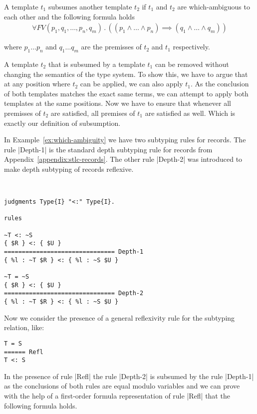 \begin{definition}
  A template $t_1$ subsumes another template $t_2$ if $t_1$ and $t_2$
  are which-ambiguous to each other and the following formula holds
  \begin{align}
    \forall FV(p_1,q_1,\dots, p_n,q_m) \,.\, ((p_1 \land\dots\land
    p_n) \implies (q_1 \land\dots\land q_m))
  \end{align}

  where $p_1 \dots p_n$ and $q_1 \dots q_m$ are the premisses of $t_2$
  and $t_1$ respectively.
\label{def:subsumes}
\end{definition}

A template $t_2$ that is subsumed by a template $t_1$ can be removed
without changing the semantics of the type system. To show this, we
have to argue that at any position where $t_2$ can be applied, we can
also apply $t_1$. As the conclusion of both templates matches the
exact same terms, we can attempt to apply both templates at the same
positions. Now we have to ensure that whenever all premisses of $t_2$
are satisfied, all premises of $t_1$ are satisfied as well. Which is
exactly our definition of subsumption.

In Example~\ref{ex:which-ambiguity} we have two subtyping rules for
records. The rule \code|Depth-1| is the standard depth subtyping rule
for records from Appendix~\ref{appendix:stlc-records}. The other rule
\code|Depth-2| was introduced to make depth subtyping of records
reflexive.

\begin{example}{~}
\begin{lstlisting}[language=sltc]
judgments Type{I} "<:" Type{I}.

rules

~T <: ~S
{ $R } <: { $U }
=============================== Depth-1
{ %l : ~T $R } <: { %l : ~S $U }

~T = ~S
{ $R } <: { $U }
=============================== Depth-2
{ %l : ~T $R } <: { %l : ~S $U }
\end{lstlisting}
\label{ex:which-ambiguity}
\end{example}

Now we consider the presence of a general reflexivity rule for the
subtyping relation, like:

\begin{lstlisting}
T = S
====== Refl
T <: S
\end{lstlisting}

In the presence of rule \code|Refl| the rule \code|Depth-2| is
subsumed by the rule \code|Depth-1| as the conclusions of both rules
are equal modulo variables and we can prove with the help of a
first-order formula representation of rule \code|Refl| that the
following formula holds.

